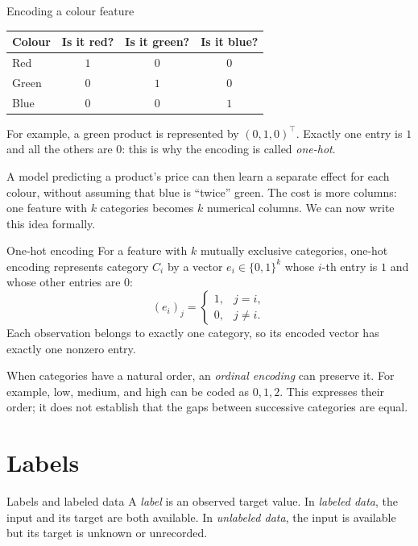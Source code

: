 \documentclass[a4paper,12pt,oneside]{report}
\begin{document}
\begin{framedexample}{Encoding a colour feature}
\begin{center}
\begin{tabular}{@{}lccc@{}}
\toprule
\textbf{Colour} & \textbf{Is it red?} & \textbf{Is it green?} & \textbf{Is it blue?} \\
\midrule
Red   & $1$ & $0$ & $0$ \\
Green & $0$ & $1$ & $0$ \\
Blue  & $0$ & $0$ & $1$ \\
\bottomrule
\end{tabular}
\end{center}
For example, a green product is represented by $(0,1,0)^\top$.
Exactly one entry is $1$ and all the others are $0$: this is why the
encoding is called \emph{one-hot}.
\end{framedexample}

A model predicting a product's price can then learn a separate effect
for each colour, without assuming that blue is ``twice'' green.
The cost is more columns: one feature with $k$ categories becomes $k$
numerical columns. We can now write this idea formally.

\begin{frameddefn}{One-hot encoding}\label{def:one-hot}
For a feature with $k$ mutually exclusive categories, one-hot encoding
represents category $C_i$ by a vector $e_i\in\{0,1\}^{k}$ whose $i$-th
entry is $1$ and whose other entries are $0$:
\[
  (e_i)_j=\begin{cases}
    1,&j=i,\\
    0,&j\neq i.
  \end{cases}
\]
Each observation belongs to exactly one category, so its encoded vector
has exactly one nonzero entry.
\end{frameddefn}

When categories have a natural order, an \emph{ordinal encoding} can
preserve it. For example, low, medium, and high can be coded as $0,1,2$.
This expresses their order; it does not establish that the gaps between
successive categories are equal.

\section{Labels}

\begin{frameddefn}{Labels and labeled data}\label{def:labels}
A \emph{label} is an observed target value. In \emph{labeled data}, the
input and its target are both available.\newline
In \emph{unlabeled data}, the
input is available but its target is unknown or unrecorded.
\end{frameddefn}
\end{document}
